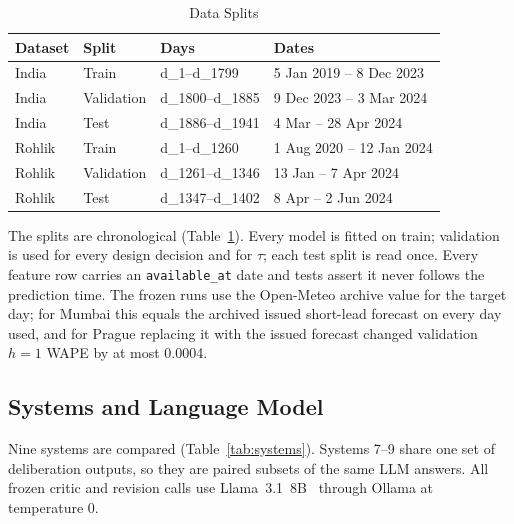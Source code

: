 \documentclass[conference]{IEEEtran}
\begin{document}
\begin{table}[t]
\caption{Data Splits}
\label{tab:splits}
\centering
\footnotesize
\begin{tabular}{@{}llll@{}}
\toprule
Dataset & Split & Days & Dates \\
\midrule
India  & Train      & d\_1--d\_1799    & 5 Jan 2019 -- 8 Dec 2023 \\
India  & Validation & d\_1800--d\_1885 & 9 Dec 2023 -- 3 Mar 2024 \\
India  & Test       & d\_1886--d\_1941 & 4 Mar -- 28 Apr 2024 \\
\midrule
Rohlik & Train      & d\_1--d\_1260    & 1 Aug 2020 -- 12 Jan 2024 \\
Rohlik & Validation & d\_1261--d\_1346 & 13 Jan -- 7 Apr 2024 \\
Rohlik & Test       & d\_1347--d\_1402 & 8 Apr -- 2 Jun 2024 \\
\bottomrule
\end{tabular}
\end{table}

The splits are chronological (Table~\ref{tab:splits}). Every model is fitted on train; validation is
used for every design decision and for $\tau$; each test split is read once. Every feature row
carries an \texttt{available\_at} date and tests assert it never follows the prediction time. The
frozen runs use the Open-Meteo archive value for the target day; for Mumbai this equals the archived
issued short-lead forecast on every day used, and for Prague replacing it with the issued forecast
changed validation $h=1$ WAPE by at most 0.0004.

\subsection{Systems and Language Model}
Nine systems are compared (Table~\ref{tab:systems}). Systems 7--9 share one set of deliberation
outputs, so they are paired subsets of the same LLM answers. All frozen critic and revision calls use
Llama~3.1~8B~\cite{llama3} through Ollama at temperature 0.
\end{document}
